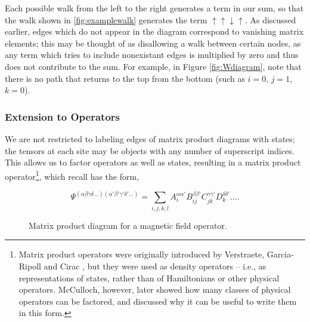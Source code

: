 \documentclass[12pt]{amsbook}
\theoremstyle{plain}
\theoremstyle{definition}
\theoremstyle{remark}
\begin{document}
Each possible walk from the left to the right generates a term in our sum, so that the walk shown in \ref{fig:examplewalk} generates the term $\uparrow\uparrow\downarrow\uparrow$.  As discussed earlier, edges which do not appear in the diagram correspond to vanishing matrix elements;  this may be thought of as disallowing a walk between certain nodes, as any term which tries to include nonexistant edges is multiplied by zero and thus does not contribute to the sum.  For example, in Figure \ref{fig:Wdiagram}, note that there is no path that returns to the top from the bottom (such as $i=0$, $j=1$, $k=0$).
\subsubsection{Extension to Operators}

We are not restricted to labeling edges of matrix product diagrams with states;  the tensors at each site may be objects with any number of superscript indices.  This allows us to factor operators as well as states, resulting in a matrix product operator\footnote{Matrix product operators were originally introduced by Verstraete, Garcia-Ripoll and Cirac \cite{cond-mat/0406426}, but they were used as density operators -- i.e., as representations of states, rather than of Hamiltonians or other physical operators.  McCulloch, however, later showed how many classes of physical operators can be factored, and discussed why it can be useful to write them in this form\cite{cond-mat/0701428}.}, which recall has the form,

$$\Psi^{(\alpha\beta\gamma\delta\dots)(\alpha'\beta'\gamma'\delta'\dots)} = \sum_{i,j,k,l} A_i^{\alpha\alpha'} B_{ij}^{\beta\beta'} C_{jk}^{\gamma\gamma'} D_{k}^{\delta\delta'} \dots.$$

\begin{figure}
\caption{Matrix product diagram for a magnetic field operator. \label{fig:magfield}}
\end{figure}
\end{document}
